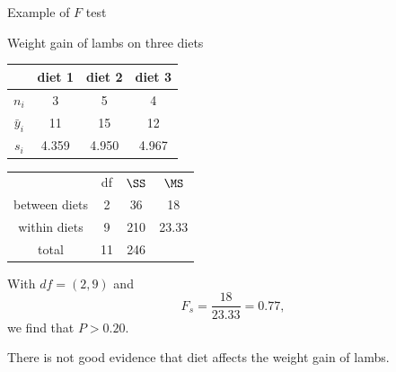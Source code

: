 \begin{frame}{Example of $F$ test}

    Weight gain of lambs on three diets
    \begin{center}
        \begin{tabular}{cccc}
            & diet 1 & diet 2 & diet 3 \\
            \hline
            $n_i$ & 3 & 5 & 4 \\
            $\bar y_i$ & 11 & 15 & 12 \\
            $s_i$ & 4.359 & 4.950 & 4.967 \\
        \end{tabular}
    \end{center}

    \pause

    \begin{center}
        \begin{tabular}{cccc}
            & df & $\SS$ & $\MS$ \\
            between diets & 2 & 36 & 18 \\
            within diets & 9 & 210 & 23.33 \\
            \hline
            total & 11 & 246 & \\
        \end{tabular}
    \end{center}


    \vspace{2em}

    With $df = (2,9)$ and
    \[ F_s = \frac{ 18 }{ 23.33 } = 0.77 , \]
    we find that $P > 0.20$.


    \vspace{2em}

    \pause
    There is not good evidence that diet affects the weight gain of lambs.


\end{frame}

